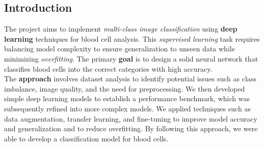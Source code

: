 \documentclass[11pt]{article}
\begin{document}
    \begin{multicols*}{2}        
        \section{Introduction}
        The project aims to implement \textit{multi-class image classification} using \textbf{deep learning} techniques for blood cell analysis. This \textit{supervised learning} task requires balancing model complexity to ensure generalization to unseen data while minimizing \textit{overfitting}. The primary \textbf{goal} is to design a solid neural network that classifies blood cells into the correct categories with high accuracy.
        \\The \textbf{approach} involves dataset analysis to identify potential issues such as class imbalance, image quality, and the need for preprocessing. We then developed simple deep learning models to establish a performance benchmark, which was subsequently refined into more complex models. We applied techniques such as data augmentation, transfer learning, and fine-tuning to improve model accuracy and generalization and to reduce overfitting. By following this approach, we were able to develop a classification model for blood cells.
        

\end{multicols*}
\end{document}
